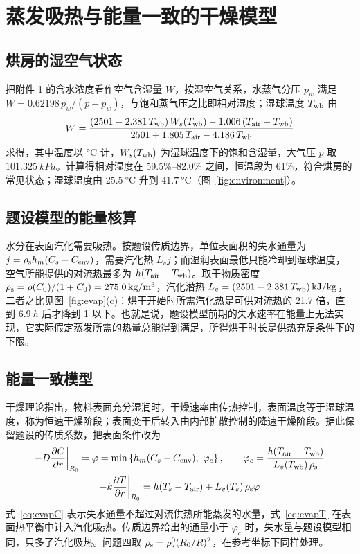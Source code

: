 \section{蒸发吸热与能量一致的干燥模型}\label{sec:evap}

\subsection{烘房的湿空气状态}

把附件 1 的含水浓度看作空气含湿量 $W$，按湿空气关系\cite{ashrae}，水蒸气分压 $p_w$ 满足 $W=0.62198\,p_w/(p-p_w)$，与饱和蒸气压之比即相对湿度；湿球温度 $\Twb$ 由
\begin{equation}
W=\frac{(2501-2.381\,\Twb)\,W_s(\Twb)-1.006\,(\Tair-\Twb)}{2501+1.805\,\Tair-4.186\,\Twb}
\label{eq:wb}
\end{equation}
求得，其中温度以 \si{\celsius} 计，$W_s(\Twb)$ 为湿球温度下的饱和含湿量，大气压 $p$ 取 $\SI{101.325}{kPa}$。计算得相对湿度在 59.5\%--82.0\% 之间，恒温段为 61\%，符合烘房的常见状态；湿球温度由 $\SI{25.5}{\celsius}$ 升到 $\SI{41.7}{\celsius}$（图~\ref{fig:environment}）。

\subsection{题设模型的能量核算}

水分在表面汽化需要吸热。按题设传质边界，单位表面积的失水通量为 $j=\rhos h_m(C_s-\Cenv)$，需要汽化热 $L_vj$；而湿润表面最低只能冷却到湿球温度，空气所能提供的对流热最多为 $h(\Tair-\Twb)$。取干物质密度 $\rhos=\rho(C_0)/(1+C_0)=\SI{275.0}{kg/m^3}$，汽化潜热 $L_v=(2501-2.381\,\Twb)\,\si{kJ/kg}$\cite{ashrae}，二者之比见图~\ref{fig:evap}(c)：烘干开始时所需汽化热是可供对流热的 21.7 倍，直到 $\SI{6.9}{h}$ 后才降到 1 以下。也就是说，题设模型前期的失水速率在能量上无法实现，它实际假定蒸发所需的热量总能得到满足，所得烘干时长是供热充足条件下的下限。

\subsection{能量一致模型}

干燥理论指出，物料表面充分湿润时，干燥速率由传热控制，表面温度等于湿球温度，称为恒速干燥阶段；表面变干后转入由内部扩散控制的降速干燥阶段\cite{tan,mujumdar}。据此保留题设的传质系数，把表面条件改为
\begin{gather}
-D\pd{C}{r}\bigg|_{R_0}=\varphi=\min\left\{h_m(C_s-\Cenv),\ \varphi_c\right\},\qquad \varphi_c=\frac{h(\Tair-\Twb)}{L_v(\Twb)\,\rhos} \label{eq:evapC}\\
-k\pd{T}{r}\bigg|_{R_0}=h(T_s-\Tair)+L_v(T_s)\,\rhos\varphi \label{eq:evapT}
\end{gather}
式~\eqref{eq:evapC} 表示失水通量不超过对流供热所能蒸发的水量，式~\eqref{eq:evapT} 在表面热平衡中计入汽化吸热。传质边界给出的通量小于 $\varphi_c$ 时，失水量与题设模型相同，只多了汽化吸热。问题四取 $\rhos=\rhos^0(R_0/R)^2$，在参考坐标下同样处理。

